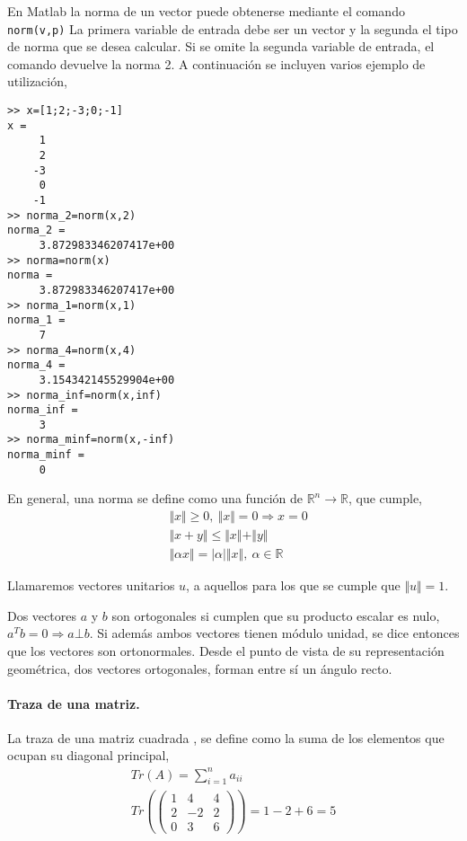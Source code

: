 En Matlab la norma de un vector puede obtenerse mediante el comando \texttt{norm(v,p)} La primera variable de entrada debe ser un vector y la segunda el tipo de norma que se desea calcular. Si se omite la segunda variable de entrada, el comando devuelve la norma 2. A continuación se incluyen varios ejemplo de utilización,
\begin{verbatim}
>> x=[1;2;-3;0;-1]
x =
     1
     2
    -3
     0
    -1
>> norma_2=norm(x,2)
norma_2 =
     3.872983346207417e+00
>> norma=norm(x)
norma =
     3.872983346207417e+00
>> norma_1=norm(x,1)
norma_1 =
     7
>> norma_4=norm(x,4)
norma_4 =
     3.154342145529904e+00
>> norma_inf=norm(x,inf)
norma_inf =
     3
>> norma_minf=norm(x,-inf)
norma_minf =
     0
\end{verbatim} 

En general, una norma se define como una función de $\mathbb{R}^n \rightarrow \mathbb{R}$, que cumple,
\begin{align*}
&\Vert x\Vert \geq 0,\  \Vert x\Vert =0 \Rightarrow x=0\\
&\Vert x+y\Vert \leq \Vert x\Vert +\Vert y\Vert \\
&\Vert \alpha x\Vert = \vert \alpha \vert \Vert x\Vert ,\ \alpha \in \mathbb{R} 
\end{align*}

Llamaremos vectores unitarios $u$, a aquellos para los que se cumple que $\Vert u \Vert=1$.

Dos vectores $a$ y $b$ son ortogonales si cumplen que su producto escalar es nulo, $a^Tb=0 \Rightarrow  a\bot b$. Si además ambos vectores tienen módulo unidad, se dice entonces que los vectores son ortonormales.  Desde el punto de vista de su representación geométrica, dos vectores ortogonales, forman entre sí un ángulo recto.

\paragraph{Traza de una matriz.} La traza de una matriz cuadrada , se define como la suma de los elementos que ocupan su diagonal principal, 
\begin{gather*}
Tr(A)=\sum_{i=1}^na_{ii}\\
Tr\left(
\begin{pmatrix}
1& 4 & 4\\
2& -2 & 2\\
0& 3 & 6
\end{pmatrix}\right)=1-2+6=5
\end{gather*}


